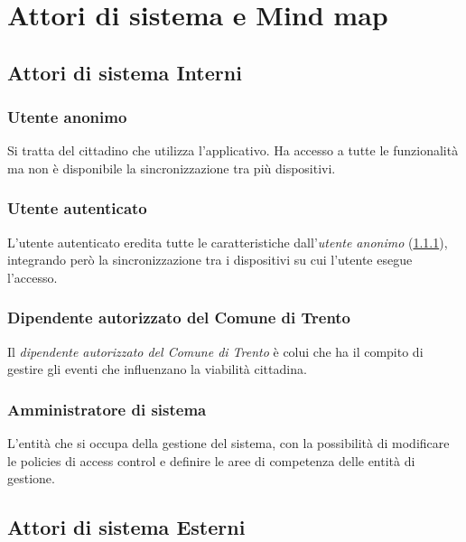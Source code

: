 \documentclass{article}
\begin{document}
\section{Attori di sistema e Mind map}

\subsection{Attori di sistema Interni}

\subsubsection{Utente anonimo}\label{Attori_UtenteAnonimo}
\label{3.1.1}
Si tratta del cittadino che utilizza l'applicativo. Ha accesso a tutte le funzionalità ma non è disponibile la sincronizzazione tra più dispositivi.

\subsubsection{Utente autenticato}
\label{3.1.2}
L'utente autenticato eredita tutte le caratteristiche dall'\textit{utente anonimo} (\ref{Attori_UtenteAnonimo}), integrando però la sincronizzazione tra i dispositivi su cui l'utente esegue l'accesso.

\subsubsection{Dipendente autorizzato del Comune di Trento}\label{Attori_DipendenteAutorizzato}
\label{3.1.3}
Il \textit{dipendente autorizzato del Comune di Trento} è colui che ha il compito di gestire gli eventi che influenzano la viabilità cittadina.

\subsubsection{Amministratore di sistema}
\label{3.1.4}
L'entità che si occupa della gestione del sistema, con la possibilità di modificare le policies di access control e definire le aree di competenza delle entità di gestione.

\subsection{Attori di sistema Esterni}
\end{document}
